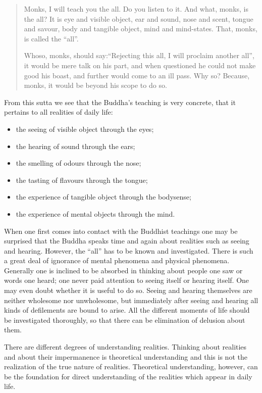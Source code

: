 \documentclass{book}
\begin{document}
\begin{quote}
Monks, I will teach you the all. Do you listen to it. And what, monks,
is the all? It is eye and visible object, ear and sound, nose and scent,
tongue and savour, body and tangible object, mind and mind-states. That,
monks, is called the ``all''.

Whoso, monks, should say:``Rejecting this all, I will proclaim another
all'', it would be mere talk on his part, and when questioned he could not
make good his boast, and further would come to an ill pass. Why so?
Because, monks, it would be beyond his scope to do so.
\end{quote}

From this sutta we see that the Buddha's teaching is very concrete, that
it pertains to all realities of daily life:

\begin{itemize}
\item
  the seeing of visible object through the eyes;
\item
  the hearing of sound through the ears;
\item
  the smelling of odours through the nose;
\item
  the tasting of flavours through the tongue;
\item
  the experience of tangible object through the bodysense;
\item
  the experience of mental objects through the mind.
\end{itemize}

When one first comes into contact with the Buddhist teachings one may be
surprised that the Buddha speaks time and again about realities such as
seeing and hearing. However, the ``all'' has to be known and
investigated. There is such a great deal of ignorance of mental
phenomena and physical phenomena. Generally one is inclined to be
absorbed in thinking about people one saw or words one heard; one never
paid attention to seeing itself or hearing itself. One may even doubt
whether it is useful to do so. Seeing and hearing themselves are neither
wholesome nor unwholesome, but immediately after seeing and hearing all
kinds of defilements are bound to arise. All the different moments of
life should be investigated thoroughly, so that there can be elimination
of delusion about them.

There are different degrees of understanding realities. Thinking about
realities and about their imper­manence is theor­etical understanding
and this is not the realization of the true nature of realities.
Theoretical understanding, however, can be the foundation for direct
understanding of the realities which appear in daily life.
\end{document}
